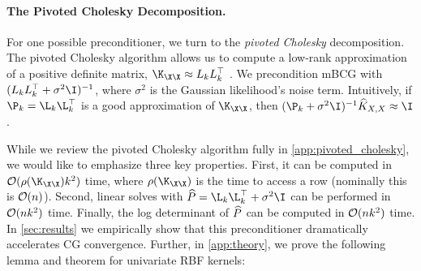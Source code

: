 \paragraph{The Pivoted Cholesky Decomposition.}
For one possible preconditioner, we turn to the \emph{pivoted Cholesky} decomposition.
The pivoted Cholesky algorithm allows us to compute a low-rank approximation of a positive definite matrix, $\K_{\X\X} \approx L_{k}L_{k}^{\top}$ \cite{harbrecht2012low}.
We precondition mBCG with $(L_k L_k^\top + \sigma^2 \I)^{-1}$, where $\sigma^2$ is the Gaussian likelihood's noise term.
Intuitively, if $\P_{k}=\L_{k}\L_{k}^{\top}$ is a good approximation of $\K_{\X\X}$, then $(\P_{k} + \sigma^{2}\I)^{-1}\trainK \approx \I$.

While we review the pivoted Cholesky algorithm fully in \autoref{app:pivoted_cholesky}, we would like to emphasize three key properties. First, it can be computed in $\bigo{\row{\K_{\X\X}}k^{2}}$ time, where $\row{\K_{\X\X}}$ is the time to access a row (nominally this is $\bigo{n}$).
Second, linear solves with $\trainP = \L_{k}\L_{k}^{\top} + \sigma^{2}\I$ can be performed in $\bigo{nk^{2}}$ time. Finally, the log determinant of $\widehat{P}$ can be computed in $\bigo{nk^{2}}$ time.
In \autoref{sec:results} we empirically show that this preconditioner dramatically accelerates CG convergence.
Further, in \autoref{app:theory}, we prove the following lemma and theorem for univariate RBF kernels:

